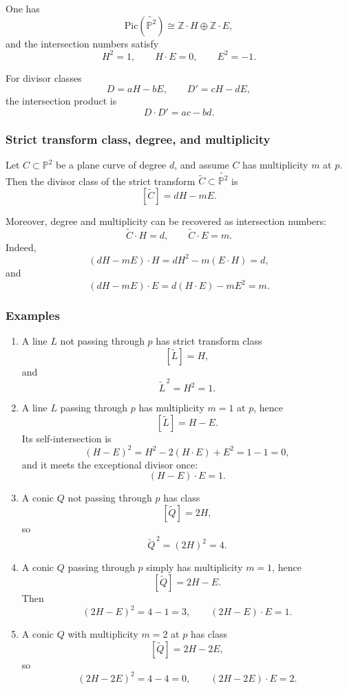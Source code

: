 \documentclass[12pt,a4paper]{article}
\theoremstyle{plain}
\theoremstyle{definition}      %
\begin{document}
One has
\[
\mathrm{Pic}(\widetilde{\mathbb P^2})\cong \mathbb Z\cdot H \oplus \mathbb Z\cdot E,
\]
and the intersection numbers satisfy
\[
H^2=1,
\qquad
H\cdot E=0,
\qquad
E^2=-1.
\]

For divisor classes
\[
D=aH-bE,
\qquad
D'=cH-dE,
\]
the intersection product is
\[
D\cdot D' = ac-bd.
\]

\subsubsection*{Strict transform class, degree, and multiplicity}

Let $C\subset \mathbb P^2$ be a plane curve of degree $d$, and assume $C$ has multiplicity $m$ at $p$.
Then the divisor class of the strict transform $\widetilde C\subset \widetilde{\mathbb P^2}$ is
\[
[\widetilde C]=dH-mE.
\]

Moreover, degree and multiplicity can be recovered as intersection numbers:
\[
\widetilde C\cdot H = d,
\qquad
\widetilde C\cdot E = m.
\]
Indeed,
\[
(dH-mE)\cdot H = dH^2-m(E\cdot H)=d,
\]
and
\[
(dH-mE)\cdot E = d(H\cdot E)-mE^2=m.
\]

\subsubsection*{Examples}

\begin{enumerate}
	\item A line $L$ not passing through $p$ has strict transform class
	\[
	[\widetilde L]=H,
	\]
	and
	\[
	\widetilde L^{\,2}=H^2=1.
	\]
	
	\item A line $L$ passing through $p$ has multiplicity $m=1$ at $p$, hence
	\[
	[\widetilde L]=H-E.
	\]
	Its self-intersection is
	\[
	(H-E)^2=H^2-2(H\cdot E)+E^2=1-1=0,
	\]
	and it meets the exceptional divisor once:
	\[
	(H-E)\cdot E = 1.
	\]
	
	\item A conic $Q$ not passing through $p$ has class
	\[
	[\widetilde Q]=2H,
	\]
	so
	\[
	\widetilde Q^{\,2}=(2H)^2=4.
	\]
	
	\item A conic $Q$ passing through $p$ simply has multiplicity $m=1$, hence
	\[
	[\widetilde Q]=2H-E.
	\]
	Then
	\[
	(2H-E)^2 = 4-1 = 3,
	\qquad
	(2H-E)\cdot E = 1.
	\]
	
	\item A conic $Q$ with multiplicity $m=2$ at $p$ has class
	\[
	[\widetilde Q]=2H-2E,
	\]
	so
	\[
	(2H-2E)^2=4-4=0,
	\qquad
	(2H-2E)\cdot E = 2.
	\]
\end{enumerate}
\end{document}
